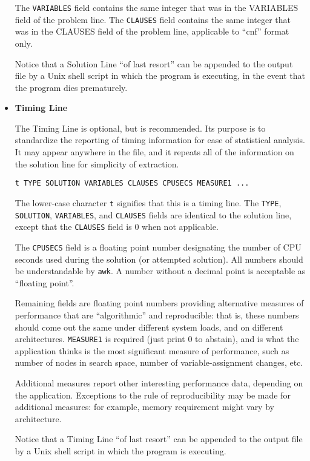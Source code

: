 \documentclass[12pt]{article}
\begin{document}
\begin{itemize}
The {\tt VARIABLES} field contains the same integer that was in
the VARIABLES field of the problem line.
The {\tt CLAUSES} field contains the same integer that was in
the CLAUSES field of the problem line, applicable to ``cnf'' format only.

Notice that a Solution Line ``of last resort'' can be appended to
the output file by a Unix shell script in which the program is executing,
in the event that the program dies prematurely.

\item {\bf Timing Line}

The Timing Line is optional, but is recommended.
Its purpose is to standardize the reporting of timing information
for ease of statistical analysis.
It may appear anywhere in the file, and it repeats all
of the information on the solution line for simplicity of extraction.
\begin{verbatim}
t TYPE SOLUTION VARIABLES CLAUSES CPUSECS MEASURE1 ...
\end{verbatim}
The lower-case character {\tt t} signifies that this is a timing
line. The {\tt TYPE}, {\tt SOLUTION}, {\tt VARIABLES},
and {\tt CLAUSES} fields are identical to the solution line, except
that the {\tt CLAUSES} field is 0 when not applicable.

The {\tt CPUSECS} field is a floating point number designating
the number of CPU seconds used during the solution (or attempted
solution).  All numbers should be understandable by {\tt awk}.
A number without a decimal point is acceptable as ``floating point''.

Remaining fields are floating point numbers providing alternative
measures of performance that are ``algorithmic'' and reproducible:
that is, these numbers should come out the same under different
system loads, and on different architectures.
{\tt MEASURE1} is required (just print 0 to abstain), and is what
the application thinks is the most significant measure of
performance, such as number of nodes in search space, number of
variable-assignment changes, etc.

Additional measures report other interesting performance data,
depending on the application.
Exceptions to the rule of reproducibility may be made for additional
measures: for example, memory requirement might vary by architecture.

Notice that a Timing Line ``of last resort'' can be appended to
the output file by a Unix shell script in which the program is executing.



\end{itemize}
\end{document}
